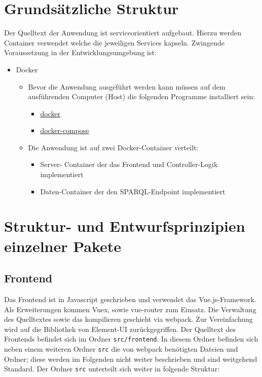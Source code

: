 \documentclass[a4paper,11pt,oneside, titlepage]{article}
\begin{document}
\section{Grundsätzliche Struktur}
Der Quelltext der Anwendung ist serviceorientiert aufgebaut. Hierzu werden Container verwendet welche die jeweiligen Services kapseln. Zwingende Voraussetzung in der Entwicklungsumgebung ist: 
\begin{itemize}
	\item Docker
	\begin{itemize}
		\item Bevor die Anwendung ausgeführt werden kann müssen auf dem ausführenden Computer (Host) die folgenden Programme installiert sein:
		\begin{itemize}
			\item \href{https://www.docker.com/get-docker}{docker}
			\item \href{https://docs.docker.com/compose/}{docker-compose} 
		\end{itemize}
		\item Die Anwendung ist auf zwei Docker-Container verteilt:
		\begin{itemize}
			\item Server-
			Container der das Frontend und Controller-Logik implementiert
			\item Daten-Container der den SPARQL-Endpoint implementiert
		\end{itemize}
		
	\end{itemize}	
\end{itemize}
\section{Struktur- und Entwurfsprinzipien einzelner Pakete}

  \subsection*{Frontend}
Das Frontend ist in \gls{Javascript} geschrieben und verwendet das \gls{Vue.js}-Framework. Als Erweiterungen kommen \gls{Vuex}, sowie \gls{vue-router} zum Einsatz. Die Verwaltung des Quelltextes sowie das kompilieren geschieht via \gls{webpack}. Zur Vereinfachung wird auf die Bibliothek von \gls{Element-UI} zurückgegriffen. Der Quelltext des Frontends befindet sich im Ordner \verb+src/frontend+. In diesem Ordner befinden sich neben einem weiteren Ordner \verb+src+ die von \gls{webpack} benötigten Dateien und Ordner; diese werden im Folgenden nicht weiter beschrieben und sind weitgehend Standard. Der Ordner \verb+src+ unterteilt sich weiter in folgende Struktur:
\newline
\end{document}
